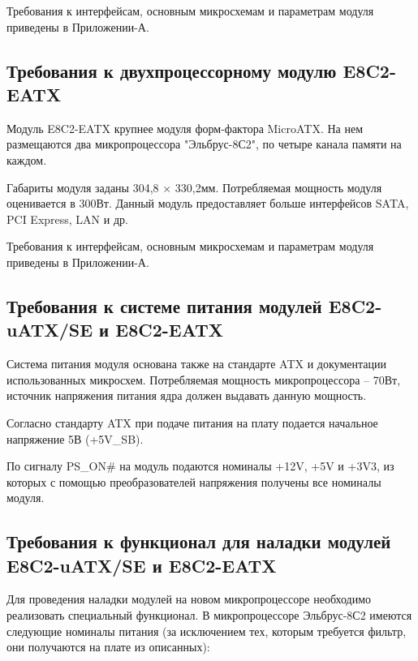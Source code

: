 Требования к интерфейсам, основным микросхемам и параметрам модуля приведены в Приложении-А.

\subsection{Требования к двухпроцессорному модулю E8C2-EATX}

Модуль E8C2-EATX крупнее модуля форм-фактора MicroATX. На нем размещаются два микропроцессора "Эльбрус-8С2", по четыре канала памяти на каждом. 

Габариты модуля заданы 304,8 $\times$ 330,2мм. Потребляемая мощность модуля оценивается в 300Вт. Данный модуль предоставляет больше интерфейсов SATA, PCI Express, LAN и др.

Требования к интерфейсам, основным микросхемам и параметрам модуля приведены в Приложении-А.

\subsection{Требования к системе питания модулей E8C2-uATX/SE и E8C2-EATX}

Система питания модуля основана также на стандарте ATX и документации использованных микросхем. Потребляемая мощность микропроцессора -- 70Вт, источник напряжения питания ядра должен выдавать данную мощность.

Согласно стандарту ATX при подаче питания на плату подается начальное напряжение 5В (+5V\_SB).


По сигналу PS\_ON\# на модуль подаются номиналы +12V, +5V и +3V3, из которых с помощью преобразователей напряжения получены все номиналы модуля.


\subsection{Требования к функционал для наладки модулей E8C2-uATX/SE и E8C2-EATX}
Для проведения наладки модулей на новом микропроцессоре необходимо реализовать специальный функционал. В микропроцессоре Эльбрус-8С2 имеются следующие номиналы питания (за исключением тех, которым требуется фильтр, они получаются на плате из описанных):
 
